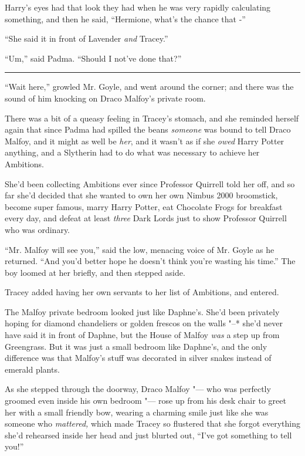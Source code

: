 Harry's eyes had that look they had when he was very rapidly calculating
something, and then he said, ``Hermione, what's the chance that -''

``She said it in front of Lavender \emph{and} Tracey.''

``Um,'' said Padma. ``Should I not've done that?''

\begin{center}\rule{3in}{0.4pt}\end{center}

``Wait here,'' growled Mr. Goyle, and went around the corner; and there
was the sound of him knocking on Draco Malfoy's private room.

There was a bit of a queasy feeling in Tracey's stomach, and she
reminded herself again that since Padma had spilled the beans
\emph{someone} was bound to tell Draco Malfoy, and it might as well be
\emph{her}, and it wasn't as if she \emph{owed} Harry Potter anything,
and a Slytherin had to do what was necessary to achieve her Ambitions.

She'd been collecting Ambitions ever since Professor Quirrell told her
off, and so far she'd decided that she wanted to own her own Nimbus 2000
broomstick, become super famous, marry Harry Potter, eat Chocolate Frogs
for breakfast every day, and defeat at least \emph{three} Dark Lords
just to show Professor Quirrell who was ordinary.

``Mr. Malfoy will see you,'' said the low, menacing voice of Mr. Goyle
as he returned. ``And you'd better hope he doesn't think you're wasting
his time.'' The boy loomed at her briefly, and then stepped aside.

Tracey added having her own servants to her list of Ambitions, and
entered.

The Malfoy private bedroom looked just like Daphne's. She'd been
privately hoping for diamond chandeliers or golden frescos on the walls
"--* she'd never have said it in front of Daphne, but the House of Malfoy
\emph{was} a step up from Greengrass. But it was just a small bedroom
like Daphne's, and the only difference was that Malfoy's stuff was
decorated in silver snakes instead of emerald plants.

As she stepped through the doorway, Draco Malfoy "--- who was perfectly
groomed even inside his own bedroom "--- rose up from his desk chair to
greet her with a small friendly bow, wearing a charming smile just like
she was someone who \emph{mattered,} which made Tracey so flustered that
she forgot everything she'd rehearsed inside her head and just blurted
out, ``I've got something to tell you!''

